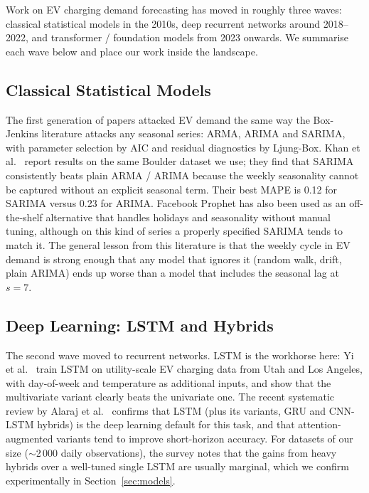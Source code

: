 Work on EV charging demand forecasting has moved in roughly three
waves: classical statistical models in the 2010s, deep recurrent
networks around 2018--2022, and transformer / foundation models from
2023 onwards. We summarise each wave below and place our work inside
the landscape.

\subsection{Classical Statistical Models}

The first generation of papers attacked EV demand the same way the
Box-Jenkins literature attacks any seasonal series: ARMA, ARIMA and
SARIMA, with parameter selection by AIC and residual diagnostics by
Ljung-Box. Khan et al.~\cite{khan2024sarima} report results on the
same Boulder dataset we use; they find that SARIMA consistently beats
plain ARMA / ARIMA because the weekly seasonality cannot be captured
without an explicit seasonal term. Their best MAPE is 0.12 for
SARIMA versus 0.23 for ARIMA. Facebook Prophet has also been used as
an off-the-shelf alternative that handles holidays and seasonality
without manual tuning, although on this kind of series a properly
specified SARIMA tends to match it. The general lesson from this
literature is that the weekly cycle in EV demand is strong enough
that any model that ignores it (random walk, drift, plain ARIMA) ends
up worse than a model that includes the seasonal lag at $s = 7$.

\subsection{Deep Learning: LSTM and Hybrids}

The second wave moved to recurrent networks. LSTM is the workhorse
here: Yi et al.~\cite{yi2022lstm} train LSTM on utility-scale EV
charging data from Utah and Los Angeles, with day-of-week and
temperature as additional inputs, and show that the multivariate
variant clearly beats the univariate one. The recent systematic
review by Alaraj et al.~\cite{alaraj2025survey} confirms that LSTM
(plus its variants, GRU and CNN-LSTM hybrids) is the deep learning
default for this task, and that attention-augmented variants tend to
improve short-horizon accuracy. For datasets of our size
($\sim$2\,000 daily observations), the survey notes that the gains
from heavy hybrids over a well-tuned single LSTM are usually marginal,
which we confirm experimentally in Section~\ref{sec:models}.


